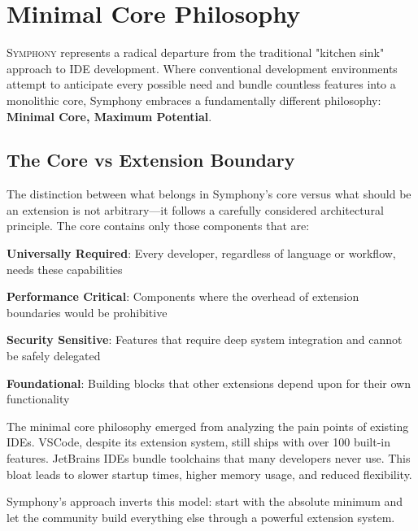 
\section*{Minimal Core Philosophy}

\vspace{0.5cm}
\lettrine{S}{ymphony} represents a radical departure from the traditional "kitchen sink" approach to IDE development. Where conventional development environments attempt to anticipate every possible need and bundle countless features into a monolithic core, Symphony embraces a fundamentally different philosophy: \textbf{Minimal Core, Maximum Potential}.

\vspace{0.3cm}
\subsection*{The Core vs Extension Boundary}

The distinction between what belongs in Symphony's core versus what should be an extension is not arbitrary—it follows a carefully considered architectural principle. The core contains only those components that are:

\begin{compactlist}
    \item \textbf{Universally Required}: Every developer, regardless of language or workflow, needs these capabilities
    \item \textbf{Performance Critical}: Components where the overhead of extension boundaries would be prohibitive
    \item \textbf{Security Sensitive}: Features that require deep system integration and cannot be safely delegated
    \item \textbf{Foundational}: Building blocks that other extensions depend upon for their own functionality
\end{compactlist}

\begin{infobox}[title=Architectural Decision Rationale]
The minimal core philosophy emerged from analyzing the pain points of existing IDEs. VSCode, despite its extension system, still ships with over 100 built-in features. JetBrains IDEs bundle toolchains that many developers never use. This bloat leads to slower startup times, higher memory usage, and reduced flexibility.

Symphony's approach inverts this model: start with the absolute minimum and let the community build everything else through a powerful extension system.
\end{infobox}

